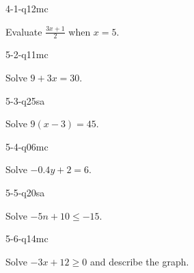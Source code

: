 \begin{practiceQuestion}{4-1-q12}{mc}
\begin{questionText}
Evaluate $\frac{3x + 1}{2}$ when $x = 5$.
\end{questionText}
\end{practiceQuestion}

\begin{practiceQuestion}{5-2-q11}{mc}
\begin{questionText}
Solve $9 + 3x = 30$.
\end{questionText}
\end{practiceQuestion}

\begin{practiceQuestion}{5-3-q25}{sa}
\begin{questionText}
Solve $9(x - 3) = 45$.
\end{questionText}
\end{practiceQuestion}

\begin{practiceQuestion}{5-4-q06}{mc}
\begin{questionText}
Solve $-0.4y + 2 = 6$.
\end{questionText}
\end{practiceQuestion}

\begin{practiceQuestion}{5-5-q20}{sa}
\begin{questionText}
Solve $-5n + 10 \leq -15$.
\end{questionText}
\end{practiceQuestion}

\begin{practiceQuestion}{5-6-q14}{mc}
\begin{questionText}
Solve $-3x + 12 \geq 0$ and describe the graph.
\end{questionText}
\end{practiceQuestion}

